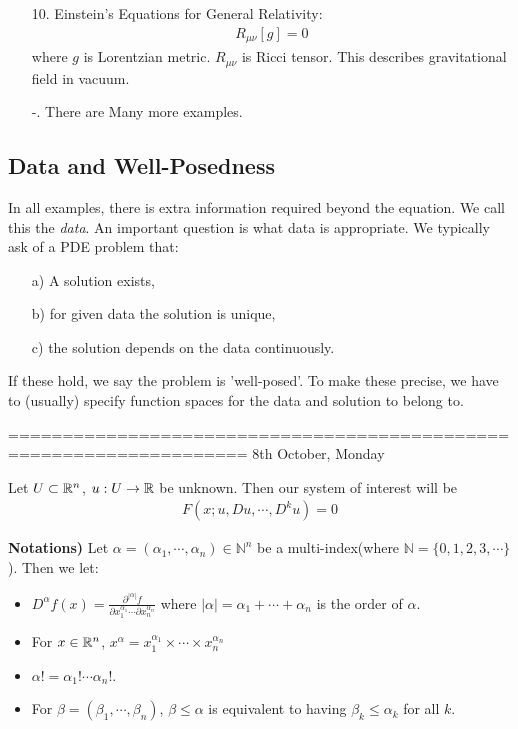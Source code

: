 \documentclass[10pt,a4paper]{report}
\begin{document}
\begin{itemize}
\item[10.] Einstein's Equations for General Relativity:
\begin{align*}
R_{\mu \nu}[g] =0
\end{align*}
where $g$ is Lorentzian metric. $R_{\mu \nu}$ is Ricci tensor. This describes gravitational field in vacuum.

\item[-.] There are Many more examples.
\end{itemize}

\subsection*{Data and Well-Posedness}
In all examples, there is extra information required beyond the equation. We call this the \emph{data}. An important question is what data is appropriate. We typically ask of a PDE problem that:
\begin{itemize}
\item[a)] A solution exists,
\item[b)] for given data the solution is unique,
\item[c)] the solution depends on the data continuously.
\end{itemize}
If these hold, we say the problem is 'well-posed'. To make these precise, we have to (usually) specify function spaces for the data and solution to belong to.
\s

====================================================================
8th October, Monday
\s

Let $U \subset \mathbb{R}^n$, $u: U \rightarrow \mathbb{R}$ be unknown. Then our system of interest will be
\begin{align}
F(x; u,Du,\cdots, D^k u)=0 \label{thePDE}
\end{align}
\s

\textbf{Notations) } Let $\alpha = (\alpha_1, \cdots, \alpha_n) \in \mathbb{N}^n$ be a multi-index(where $\mathbb{N} =\{ 0,1,2,3,\cdots\}$). Then we let:
\begin{itemize}
\item $D^{\alpha}f(x) = \frac{\partial^{| \alpha |} f}{\partial x_1^{\alpha_1} \cdots \partial x_n^{\alpha_n}}$ where $|\alpha| = \alpha_1 + \cdots + \alpha_n$ is the order of $\alpha$.
\item For $x \in \mathbb{R}^n$, $x^{\alpha} = x_1^{\alpha_1} \times \cdots \times x_n^{\alpha_n}$
\item $\alpha! = \alpha_1! \cdots \alpha_n!$.
\item For $\beta = (\beta_1, \cdots, \beta_n)$, $\beta \leq \alpha$ is equivalent to having $\beta_k \leq \alpha_k$ for all $k$.
\end{itemize}
\s
\end{document}

